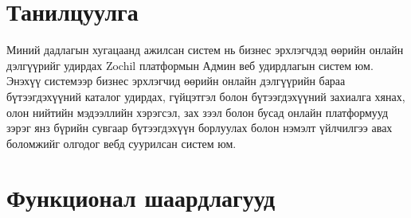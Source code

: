 \section{Танилцуулга}
Миний дадлагын хугацаанд ажилсан систем нь бизнес эрхлэгчдэд өөрийн онлайн дэлгүүрийг удирдах Zochil платформын Админ веб удирдлагын систем юм. Энэхүү системээр бизнес эрхлэгчид өөрийн онлайн дэлгүүрийн бараа бүтээгдэхүүний каталог удирдах, гүйцэтгэл болон бүтээгдэхүүний захиалга хянах, олон нийтийн мэдээллийн хэрэгсэл, зах зээл болон бусад онлайн платформууд зэрэг янз бүрийн сувгаар бүтээгдэхүүн борлуулах болон нэмэлт үйлчилгээ авах боломжийг олгодог вебд суурилсан систем юм.

\section{Функционал шаардлагууд}
